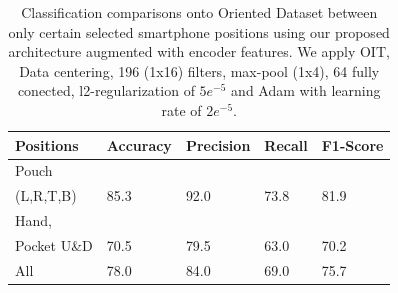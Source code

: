 \begin{table}[t]
	\begin{center}
		\begin{tabular}{ p{1.8cm}p{1.2cm}p{1.2cm}p{0.9cm}p{1.4cm}} 
			\hline
			Positions & Accuracy & Precision & Recall & F1-Score \\ 
			\hline
			Pouch \\(L,R,T,B) & 85.3 & 92.0 & 73.8 & 81.9 \\ 
			\hline
			Hand, \\ Pocket U\&D & 70.5 & 79.5 & 63.0 & 70.2 \\
			\hline
			All & 78.0 & 84.0 & 69.0 & 75.7 \\
			\hline
		\end{tabular}
		\caption{\label{tab:model-performance} Classification comparisons onto Oriented Dataset between only certain selected smartphone positions using our proposed architecture augmented with encoder features. We apply OIT, Data centering, 196 (1x16) filters, max-pool (1x4), 64 fully conected, l2-regularization of $5e^{-5}$ and Adam with learning rate of $2e^{-5}$. }
	\end{center}
\end{table}


